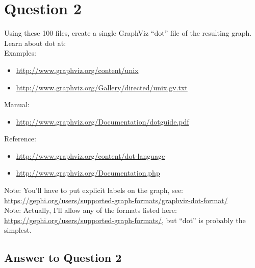 \documentclass{article}
\begin{document}
\newpage

\section*{Question 2}

Using these 100 files, create a single GraphViz ``dot'' file of the resulting graph. Learn about dot at: \\

Examples:
\begin{itemize}
\item \url{http://www.graphviz.org/content/unix}
\item \url{http://www.graphviz.org/Gallery/directed/unix.gv.txt}
\end{itemize}

Manual:
\begin{itemize}
\item \url{http://www.graphviz.org/Documentation/dotguide.pdf}
\end{itemize}

Reference:
\begin{itemize}
\item \url{http://www.graphviz.org/content/dot-language}
\item \url{http://www.graphviz.org/Documentation.php}
\end{itemize}

Note: You'll have to put explicit labels on the graph, see: \url{https://gephi.org/users/supported-graph-formats/graphviz-dot-format/} \\

Note: Actually, I'll allow any of the formats listed here: \url{https://gephi.org/users/supported-graph-formats/}, but ``dot'' is probably the simplest.


\subsection*{Answer to Question 2}
\end{document}
